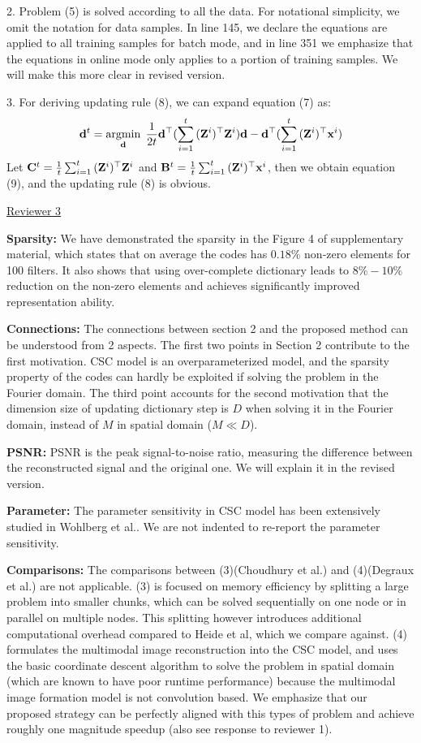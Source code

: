 \documentclass[10pt,twocolumn,letterpaper]{article}
\begin{document}
2. Problem (5) is solved according to all the data. For notational simplicity, we omit the notation for data samples. In line 145, we declare the equations are applied to all training samples for batch mode, and in line 351 we emphasize that the equations in online mode only applies to a portion of training samples. We will make this more clear in revised version.

3. For deriving updating rule (8), we can expand equation (7) as:
\begin{equation}
    \filter^t = \minimize{\filter} \frac{1}{2t} \filter^{\top} (\sum_{i=1}^{t}{(\Code^i)^{\top}\Code^i})\filter - \filter^{\top} (\sum_{i=1}^{t}{(\Code^i)^{\top}\signal^i})
\end{equation}
Let $\surC^t = \frac{1}{t}\sum_{i=1}^{t}{(\Code^i)^{\top}\Code^i}$ and $\surB^t = \frac{1}{t} \sum_{i=1}^{t}{(\Code^i)^{\top}\signal^i}$, then we obtain equation (9), and the updating rule (8) is obvious.

\underline{Reviewer 3}

\textbf{Sparsity:}
We have demonstrated the sparsity in the Figure 4 of supplementary material, which states that on average the codes has $0.18\%$ non-zero elements for 100 filters. It also shows that using over-complete dictionary leads to $8\% - 10\%$ reduction on the non-zero elements and achieves significantly improved representation ability.

\textbf{Connections:}
The connections between section 2 and the proposed method can be
understood from 2 aspects. The first two points in Section 2
contribute to the first motivation. CSC model is an overparameterized
model, and the sparsity property of the codes can hardly be exploited
if solving the problem in the Fourier domain. The third point accounts
for the second motivation that the dimension size of updating
dictionary step is $D$ when solving it in the Fourier domain, instead of $M$ in spatial domain ($M \ll D$).

\textbf{PSNR:}
PSNR is the peak signal-to-noise ratio, measuring the difference between the reconstructed signal and the original one. We will explain it in the revised version.

\textbf{Parameter:}
The parameter sensitivity in CSC model has been extensively studied in Wohlberg et al.. We are not indented to re-report the parameter sensitivity.

\textbf{Comparisons:} The comparisons between (3)(Choudhury et al.)
and (4)(Degraux et al.)  are not applicable. (3) is focused on memory
efficiency by splitting a large problem into smaller chunks, which can
be solved sequentially on one node or in parallel on multiple
nodes. This splitting however introduces additional computational
overhead compared to Heide et al, which we compare against. (4) formulates the multimodal image reconstruction into the CSC model, and uses the basic coordinate descent algorithm to solve the problem in spatial domain (which are known to have poor runtime performance) because the multimodal image formation model is not convolution based. We emphasize that our proposed strategy can be perfectly aligned with this types of problem and achieve roughly one magnitude speedup (also see response to reviewer 1).
\end{document}
